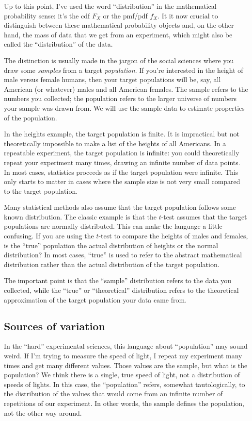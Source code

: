 Up to this point, I've used the word ``distribution'' in the mathematical
probability sense: it's the cdf $F_X$ or the pmf/pdf $f_X$.
It it now crucial to distinguish between these mathematical
probability objects and, on the other hand, the mass of data
that we get from an experiment, which might also be called the ``distribution''
of the data.

The distinction is usually made in the jargon of the social sciences where you
draw some \emph{samples} from a target \emph{population}. If you're interested
in the height of male versus female humans, then your target populations will
be, say, all American (or whatever) males and all American females. The sample
refers to the numbers you collected; the population refers to the larger
universe of numbers your sample was drawn from. We will use the sample data to
estimate properties of the population.

In the heights example, the target population is finite. It is impractical but
not theoretically impossible to make a list of the heights of all Americans.
In a repeatable experiment, the target population is infinite: you could
theoretically repeat your experiment many times, drawing an infinite number of
data points. In most cases, statistics proceeds as if the target population
were infinite. This only starts to matter in cases where the sample size is not
very small compared to the target population.

Many statistical methods also assume that the target population follows some
known distribution. The classic example is that the $t$-test assumes that the
target populations are normally distributed. This can make the language a little
confusing. If you are using the $t$-test to compare the heights of males and
females, is the ``true'' population the actual distribution of heights or the
normal distribution? In most cases, ``true'' is used to refer to the abstract
mathematical distribution rather than the actual distribution of the target
population.

The important point is that the ``sample'' distribution refers to the data you
collected, while the ``true'' or ``theoretical'' distribution refers to the
theoretical approximation of the target population your data came from.

\subsection{Sources of variation}

In the ``hard'' experimental sciences, this language about ``population'' may
sound weird. If I'm trying to measure the speed of light, I repeat my
experiment many times and get many different values. Those values are the
sample, but what is the population? We think there is a single, true speed of
light, not a distribution of speeds of lights. In this case, the ``population''
refers, somewhat tautologically, to the distribution of the values that would
come from an infinite number of repetitions of our experiment. In other words,
the sample defines the population, not the other way around.

